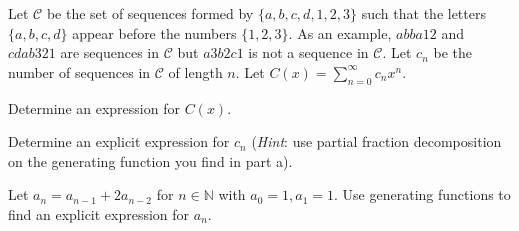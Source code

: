 \documentclass[12pt,twoside]{article}
\begin{document}
\begin{problem}{10}
Let $\mathcal{C}$ be the set of sequences formed by $\{a, b, c, d, 1, 2, 3\}$ such that the letters $\{a, b, c, d\}$ appear before the numbers $\{1, 2, 3\}$.  As an example, $abba12$ and $cdab321$ are sequences in  $\mathcal{C}$ but $a3b2c1$ is not a sequence in  $\mathcal{C}$.  Let $c_n$ be the number of sequences in  $\mathcal{C}$ of length $n$.  Let $C(x) = \displaystyle\sum\limits_{n=0}^\infty c_n x^n$. 

\bparts
{} Determine an expression for $C(x)$.  

 Determine an explicit expression for $c_n$ (\textit{Hint}: use partial fraction decomposition on the generating function you find in part a).  
\eparts

\end{problem}

\begin{problem}{10}
Let $a_n = a_{n-1} + 2a_{n-2}$ for $n \in \mathbb{N}$ with $a_0 = 1, a_1 = 1$.  Use generating functions to find an explicit expression for $a_n$.  
\end{problem}
\end{document}

